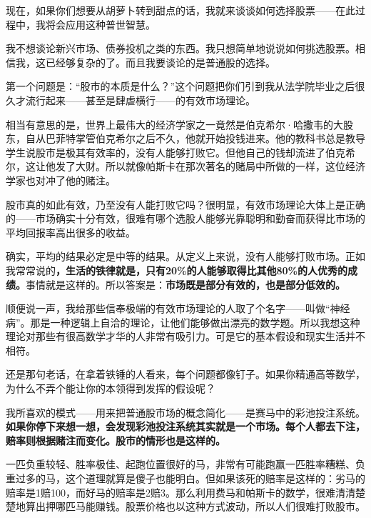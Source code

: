 现在，如果你们想要从胡萝卜转到甜点的话，我就来谈谈如何选择股票——在此过程中，我将会应用这种普世智慧。
\par

我不想谈论新兴市场、债券投机之类的东西。我只想简单地说说如何挑选股票。相信我，这已经够复杂的了。而且我要谈论的是普通股的选择。
\par

第一个问题是：“股市的本质是什么？”这个问题把你们引到我从法学院毕业之后很久才流行起来——甚至是肆虐横行——的有效市场理论。
\par

相当有意思的是，世界上最伟大的经济学家之一竟然是伯克希尔·哈撒韦的大股东，自从巴菲特掌管伯克希尔之后不久，他就开始投钱进来。他的教科书总是教导学生说股市是极其有效率的，没有人能够打败它。但他自己的钱却流进了伯克希尔，这让他发了大财。所以就像帕斯卡在那次著名的赌局中所做的一样，这位经济学家也对冲了他的赌注。
\par

股市真的如此有效，乃至没有人能打败它吗？很明显，有效市场理论大体上是正确的——市场确实十分有效，很难有哪个选股人能够光靠聪明和勤奋而获得比市场的平均回报率高出很多的收益。
\par

确实，平均的结果必定是中等的结果。从定义上来说，没有人能够打败市场。正如我常常说的\textbf{，生活的铁律就是，只有20\%的人能够取得比其他80\%的人优秀的成绩。}事情就是这样的。所以答案是：\textbf{市场既是部分有效的，也是部分低效的。}
\par

顺便说一声，我给那些信奉极端的有效市场理论的人取了个名字——叫做“神经病”。那是一种逻辑上自洽的理论，让他们能够做出漂亮的数学题。所以我想这种理论对那些有很高数学才华的人非常有吸引力。可是它的基本假设和现实生活并不相符。
\par

还是那句老话，在拿着铁锤的人看来，每个问题都像钉子。如果你精通高等数学，为什么不弄个能让你的本领得到发挥的假设呢？
\par

我所喜欢的模式——用来把普通股市场的概念简化——是赛马中的彩池投注系统。\textbf{如果你停下来想一想，会发现彩池投注系统其实就是一个市场。每个人都去下注，赔率则根据赌注而变化。股市的情形也是这样的。}
\par

一匹负重较轻、胜率极佳、起跑位置很好的马，非常有可能跑赢一匹胜率糟糕、负重过多的马，这个道理就算是傻子也能明白。但如果该死的赔率是这样的：劣马的赔率是1赔100，而好马的赔率是2赔3。那么利用费马和帕斯卡的数学，很难清清楚楚地算出押哪匹马能赚钱。股票价格也以这种方式波动，所以人们很难打败股市。
\par

